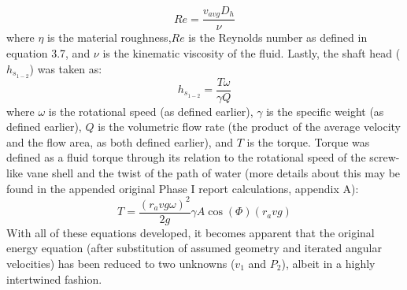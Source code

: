 \documentclass{report}
\begin{document}
\begin{equation}
Re=\frac{v_{avg}D_h}{\nu}
\end{equation}
where $\eta$ is the material roughness,$Re$ is the Reynolds number as defined in equation 3.7, and $\nu$ is the kinematic viscosity of the fluid.
Lastly, the shaft head ($h_{s_{1-2}}$) was taken as:
\begin{equation}
h_{s_{1-2}}=\frac{T\omega}{\gamma Q}
\end{equation}
where $\omega$ is the rotational speed (as defined earlier), $\gamma$ is the specific weight (as defined earlier), $Q$ is the volumetric flow rate (the product of the average velocity and the flow area, as both defined earlier), and $T$ is the torque.  Torque was defined as a fluid torque through its relation to the rotational speed of the screw-like vane shell and the twist of the path of water (more details about this may be found in the appended original Phase I report calculations, appendix A):
\begin{equation}
T=\frac{(r_avg\omega)^2}{2g}\gamma A \cos(\Phi)(r_avg)
\end{equation}
With all of these equations developed, it becomes apparent that the original energy equation (after substitution of assumed geometry and iterated angular velocities) has been reduced to two unknowns ($v_1$ and $P_2$), albeit in a highly intertwined fashion.
\end{document}
